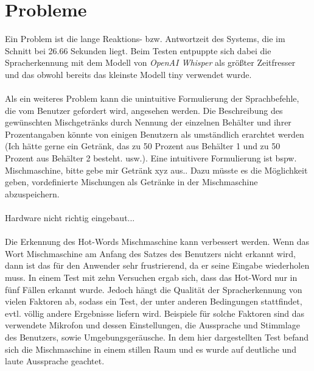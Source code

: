 \section{Probleme}
Ein Problem ist die lange Reaktions- bzw. Antwortzeit des Systems, die im Schnitt bei 26.66 Sekunden liegt. Beim Testen entpuppte sich dabei die Spracherkennung mit dem Modell von \textit{OpenAI Whisper} als größter Zeitfresser und das obwohl bereits das kleinste Modell \glqq{}tiny\grqq{} verwendet wurde.\\\\
Als ein weiteres Problem kann die unintuitive Formulierung der Sprachbefehle, die vom Benutzer gefordert wird, angesehen werden. Die Beschreibung des gewünschten Mischgetränks durch Nennung der einzelnen Behälter und ihrer Prozentangaben könnte von einigen Benutzern als umständlich erarchtet werden (\glqq{}Ich hätte gerne ein Getränk, das zu 50 Prozent aus Behälter 1 und zu 50 Prozent aus Behälter 2 besteht.\grqq{} usw.). Eine intuitivere Formulierung ist bspw. \glqq{}Mischmaschine, bitte gebe mir Getränk xyz aus.\grqq{}. Dazu müsste es die Möglichkeit geben, vordefinierte Mischungen als Getränke in der Mischmaschine abzuspeichern.\\\\
Hardware nicht richtig eingebaut...\\\\
Die Erkennung des Hot-Words \glqq{}Mischmaschine\grqq{} kann verbessert werden. Wenn das Wort \glqq{}Mischmaschine\grqq{} am Anfang des Satzes des Benutzers nicht erkannt wird, dann ist das für den Anwender sehr frustrierend, da er seine Eingabe wiederholen muss. In einem Test mit zehn Versuchen ergab sich, dass das Hot-Word nur in fünf Fällen erkannt wurde. Jedoch hängt die Qualität der Spracherkennung von vielen Faktoren ab, sodass ein Test, der unter anderen Bedingungen stattfindet, evtl. völlig andere Ergebnisse liefern wird. Beispiele für solche Faktoren sind das verwendete Mikrofon und dessen Einstellungen, die Aussprache und Stimmlage des Benutzers, sowie Umgebungsgeräusche. In dem hier dargestellten Test befand sich die Mischmaschine in einem stillen Raum und es wurde auf deutliche und laute Aussprache geachtet.
